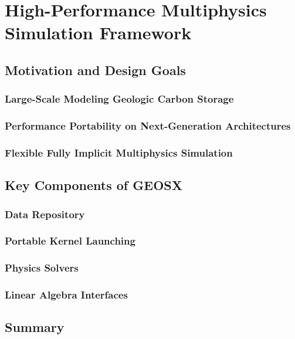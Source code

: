 \chapter{High-Performance Multiphysics Simulation Framework}
\label{ch:geosx}

\section{Motivation and Design Goals}

\subsection{Large-Scale Modeling Geologic Carbon Storage}

\subsection{Performance Portability on Next-Generation Architectures}

\subsection{Flexible Fully Implicit Multiphysics Simulation}

\section{Key Components of GEOSX}

\subsection{Data Repository}

\subsection{Portable Kernel Launching}

\subsection{Physics Solvers}

\subsection{Linear Algebra Interfaces}

\section{Summary}